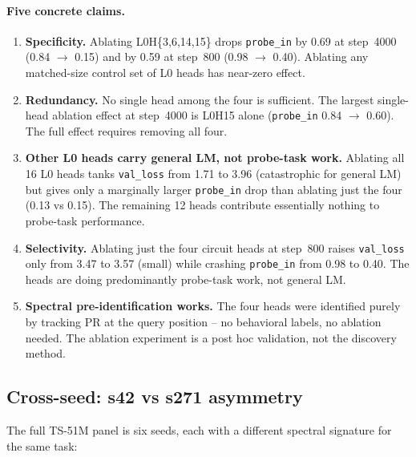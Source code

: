 \documentclass[11pt]{article}
\begin{document}
\paragraph{Five concrete claims.}

\begin{enumerate}[leftmargin=*,topsep=2pt,itemsep=2pt]
\item \textbf{Specificity.} Ablating L0H\{3,6,14,15\} drops \texttt{probe\_in} by 0.69 at step~4000 (0.84 $\to$ 0.15) and by 0.59 at step~800 (0.98 $\to$ 0.40). Ablating any matched-size control set of L0 heads has near-zero effect.

\item \textbf{Redundancy.} No single head among the four is sufficient. The largest single-head ablation effect at step~4000 is L0H15 alone (\texttt{probe\_in} 0.84 $\to$ 0.60). The full effect requires removing all four.

\item \textbf{Other L0 heads carry general LM, not probe-task work.} Ablating all 16 L0 heads tanks \texttt{val\_loss} from 1.71 to 3.96 (catastrophic for general LM) but gives only a marginally larger \texttt{probe\_in} drop than ablating just the four (0.13 vs 0.15). The remaining 12 heads contribute essentially nothing to probe-task performance.

\item \textbf{Selectivity.} Ablating just the four circuit heads at step~800 raises \texttt{val\_loss} only from 3.47 to 3.57 (small) while crashing \texttt{probe\_in} from 0.98 to 0.40. The heads are doing predominantly probe-task work, not general LM.

\item \textbf{Spectral pre-identification works.} The four heads were identified purely by tracking PR at the query position -- no behavioral labels, no ablation needed. The ablation experiment is a post hoc validation, not the discovery method.
\end{enumerate}

\subsection{Cross-seed: s42 vs s271 asymmetry}
\label{sec:s42_vs_s271}

The full TS-51M panel is six seeds, each with a different spectral signature for the same task:
\end{document}
